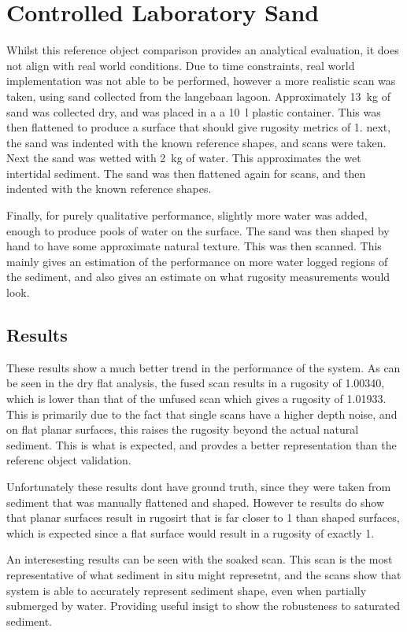 \section{Controlled Laboratory Sand}
Whilst this reference object comparison provides an analytical evaluation, it does not align with real world conditions. Due to time constraints, real world implementation was not able to be performed, however a more realistic scan was taken, using sand collected from the langebaan lagoon. 
Approximately 13~kg of sand was collected dry, and was placed in a a 10~l plastic container. This was then flattened to produce a surface that should give rugosity metrics of 1. next, the sand was indented with the known reference shapes, and scans were taken. Next the sand was wetted with  2~kg of water. This approximates the wet intertidal sediment. The sand was then flattened again for scans, and then indented with the known reference shapes. 

Finally, for purely qualitative performance, slightly more water was added, enough to produce pools of water on the surface. The sand was then shaped by hand to have some approximate natural texture. This was then scanned. This mainly gives an estimation of the performance on more water logged regions of the sediment, and also gives an estimate on what rugosity measurements would look.

\subsection{Results}

These results show a much better trend in the performance of the system. As can be seen in the dry flat analysis, the fused scan results in a rugosity of 1.00340, which is lower than that of the unfused scan which gives a rugosity of 1.01933. This is primarily due to the fact that single scans have a higher depth noise, and on flat planar surfaces, this raises the rugosity beyond the actual natural sediment. This is what is expected, and provdes a better representation than the referenc object validation.

Unfortunately these results dont have ground truth, since they were taken from sediment that was manually flattened and shaped. However te results do show that planar surfaces result in rugosirt that is far closer to 1 than shaped surfaces, which is expected since a flat surface would result in a rugosity of exactly 1.

An interesesting results can be seen with the soaked scan. This scan is the most representative of what sediment in situ might represetnt, and the scans show that system is able to accurately represent sediment shape, even when partially submerged by water. Providing useful insigt to show the robusteness to saturated sediment.

